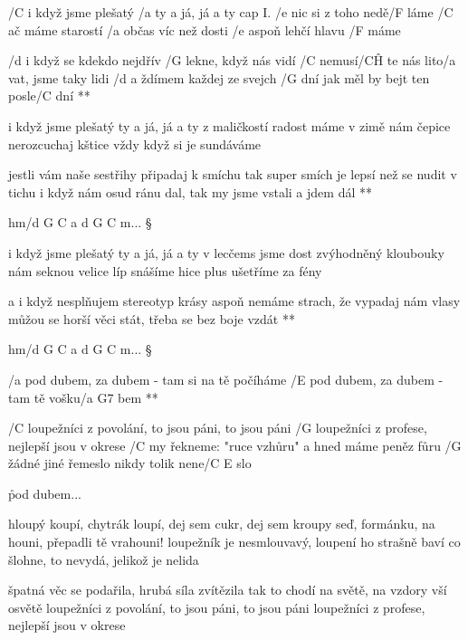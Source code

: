 




/C i když jsme plešatý /a ty a já, já a ty \hfill cap I.
/e nic si z toho nedě/F láme
/C ač máme starostí /a občas víc než dosti
/e aspoň lehčí hlavu /F máme

\R  /d i když se kdekdo nejdřív /G lekne, když nás vidí
    /C nemusí/C\^H te nás lito/a vat, jsme taky lidi
    /d a ždímem každej ze svejch /G dní
    jak měl by bejt ten posle/C dní **

i když jsme plešatý ty a já, já a ty
z maličkostí radost máme
v zimě nám čepice nerozcuchaj kštice
vždy když si je sundáváme

\R  jestli vám naše sestřihy připadaj k smíchu
    tak super smích je lepsí než se nudit v tichu
    i když nám osud ránu dal,
    tak my jsme vstali a jdem dál **

hm/{d G C a d G C} m... \S

i když jsme plešatý ty a já, já a ty
v lecčems jsme dost zvýhodněný
kloubouky nám seknou velice líp snášíme hice
plus ušetříme za fény

\R  a i když nesplňujem stereotyp krásy
    aspoň nemáme strach, že vypadaj nám vlasy
    můžou se horší věci stát,
    třeba se bez boje vzdát **

hm/{d G C a d G C} m... \S





\R  /a pod dubem, za dubem - tam si na tě počíháme
    /E pod dubem, za dubem - tam tě vošku/{a G7} bem **

/C loupežníci z povolání, to jsou páni, to jsou páni
/G loupežníci z profese, nejlepší jsou v okrese
/C my řekneme: "ruce vzhůru" a hned máme peněz fůru
/G žádné jiné řemeslo nikdy tolik nene/{C E} slo

\r pod dubem...

hloupý koupí, chytrák loupí, dej sem cukr, dej sem kroupy
seď, formánku, na houni, přepadli tě vrahouni!
loupežník je nesmlouvavý, loupení ho strašně baví
co šlohne, to nevydá, jelikož je nelida

\rr

špatná věc se podařila, hrubá síla zvítězila
tak to chodí na světě, na vzdory vší osvětě
loupežníci z povolání, to jsou páni, to jsou páni
loupežníci z profese, nejlepší jsou v okrese



